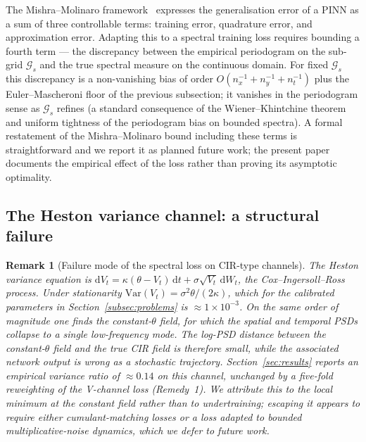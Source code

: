 \documentclass[review,12pt]{elsarticle}
\newtheorem{remark}{Remark}
\begin{document}
The Mishra--Molinaro framework~\cite{MishraMolinaro2022}
expresses the generalisation error of a PINN as a sum of three
controllable terms: training error, quadrature error, and
approximation error. Adapting this to a spectral training loss
requires bounding a fourth term --- the discrepancy between the
empirical periodogram on the sub-grid \(\mathcal G_s\) and the
true spectral measure on the continuous domain. For fixed
\(\mathcal G_s\) this discrepancy is a non-vanishing bias of order
\(O(n_x^{-1} + n_y^{-1} + n_t^{-1})\) plus the Euler--Mascheroni
floor of the previous subsection; it vanishes in the periodogram
sense as \(\mathcal G_s\) refines (a standard consequence of the
Wiener--Khintchine theorem and uniform tightness of the
periodogram bias on bounded spectra). A formal restatement of the
Mishra--Molinaro bound including these terms is straightforward
and we report it as planned future work; the present paper
documents the empirical effect of the loss rather than proving its
asymptotic optimality.

\subsection{The Heston variance channel: a structural failure}

\begin{remark}[Failure mode of the spectral loss on CIR-type channels]
\label{rem:cir}
The Heston variance equation is
\(\mathrm dV_t = \kappa(\theta - V_t)\,\mathrm dt
+ \sigma \sqrt{V_t}\,\mathrm dW_t\), the Cox--Ingersoll--Ross
process. Under stationarity
\(\mathrm{Var}(V_t) = \sigma^2 \theta / (2\kappa)\), which for the
calibrated parameters in Section~\ref{subsec:problems} is
\(\approx 1\!\times\!10^{-3}\). On the same order of magnitude one
finds the constant-\(\theta\) field, for which the spatial and
temporal PSDs collapse to a single low-frequency mode. The log-PSD
distance between the constant-\(\theta\) field and the true CIR
field is therefore small, while the associated network output is
wrong as a stochastic trajectory. Section~\ref{sec:results}
reports an empirical variance ratio of \(\approx 0.14\) on this
channel, unchanged by a five-fold reweighting of the V-channel
loss (Remedy~1). We attribute this to the local minimum at the
constant field rather than to undertraining; escaping it appears
to require either cumulant-matching losses or a loss adapted to
bounded multiplicative-noise dynamics, which we defer to future
work.
\end{remark}
\end{document}
